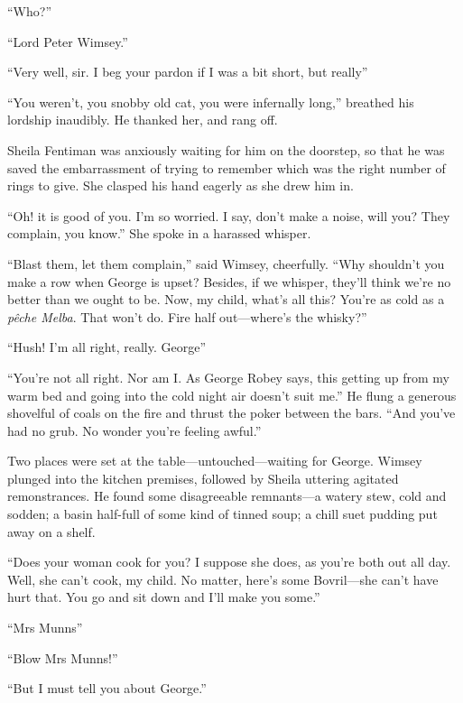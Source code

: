 \enquote{Who?}

\enquote{Lord Peter Wimsey.}

\enquote{Very well, sir. I beg your pardon if I was a bit short, but really\longdash}

\enquote{You weren't, you snobby old cat, you were infernally long,} breathed his lordship inaudibly. He thanked her, and rang off.

Sheila Fentiman was anxiously waiting for him on the doorstep, so that he was saved the embarrassment of trying to remember which was the right number of rings to give. She clasped his hand eagerly as she drew him in.

\enquote{Oh! it is good of you. I'm so worried. I say, don't make a noise, will you? They complain, you know.} She spoke in a harassed whisper.

\enquote{Blast them, let them complain,} said Wimsey, cheerfully. \enquote{Why shouldn't you make a row when George is upset? Besides, if we whisper, they'll think we're no better than we ought to be. Now, my child, what's all this? You're as cold as a \textit{pêche Melba}. That won't do. Fire half out\allowbreak---\allowbreak where's the whisky?}

\enquote{Hush! I'm all right, really. George\longdash}

\enquote{You're not all right. Nor am I. As George Robey says, this getting up from my warm bed and going into the cold night air doesn't suit me.} He flung a generous shovelful of coals on the fire and thrust the poker between the bars. \enquote{And you've had no grub. No wonder you're feeling awful.}

Two places were set at the table\allowbreak---\allowbreak untouched---waiting for George. Wimsey plunged into the kitchen premises, followed by Sheila uttering agitated remonstrances. He found some disagreeable remnants\allowbreak---\allowbreak a watery stew, cold and sodden; a basin half-full of some kind of tinned soup; a chill suet pudding put away on a shelf.

\enquote{Does your woman cook for you? I suppose she does, as you're both out all day. Well, she can't cook, my child. No matter, here's some Bovril\allowbreak---\allowbreak she can't have hurt that. You go and sit down and I'll make you some.}

\enquote{Mrs Munns\longdash}

\enquote{Blow Mrs Munns!}

\enquote{But I must tell you about George.}


